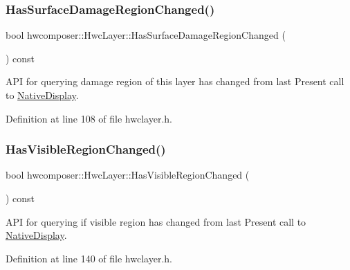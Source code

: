 \subsubsection{\texorpdfstring{Has\+Surface\+Damage\+Region\+Changed()}{HasSurfaceDamageRegionChanged()}}
{\footnotesize\ttfamily bool hwcomposer\+::\+Hwc\+Layer\+::\+Has\+Surface\+Damage\+Region\+Changed (\begin{DoxyParamCaption}{ }\end{DoxyParamCaption}) const\hspace{0.3cm}{\ttfamily [inline]}}

A\+PI for querying damage region of this layer has changed from last Present call to \mbox{\hyperlink{classhwcomposer_1_1NativeDisplay}{Native\+Display}}. 

Definition at line 108 of file hwclayer.\+h.


\begin{DoxyCode}{0}
\end{DoxyCode}
\mbox{\label{structhwcomposer_1_1HwcLayer_a609fb3677b99ffd99c2ebd0b312ef3c9}} 
\subsubsection{\texorpdfstring{Has\+Visible\+Region\+Changed()}{HasVisibleRegionChanged()}}
{\footnotesize\ttfamily bool hwcomposer\+::\+Hwc\+Layer\+::\+Has\+Visible\+Region\+Changed (\begin{DoxyParamCaption}{ }\end{DoxyParamCaption}) const\hspace{0.3cm}{\ttfamily [inline]}}

A\+PI for querying if visible region has changed from last Present call to \mbox{\hyperlink{classhwcomposer_1_1NativeDisplay}{Native\+Display}}. 

Definition at line 140 of file hwclayer.\+h.


\begin{DoxyCode}{0}
\end{DoxyCode}
\mbox{\label{structhwcomposer_1_1HwcLayer_a1696a94398a763306db26829088ea45b}} 
